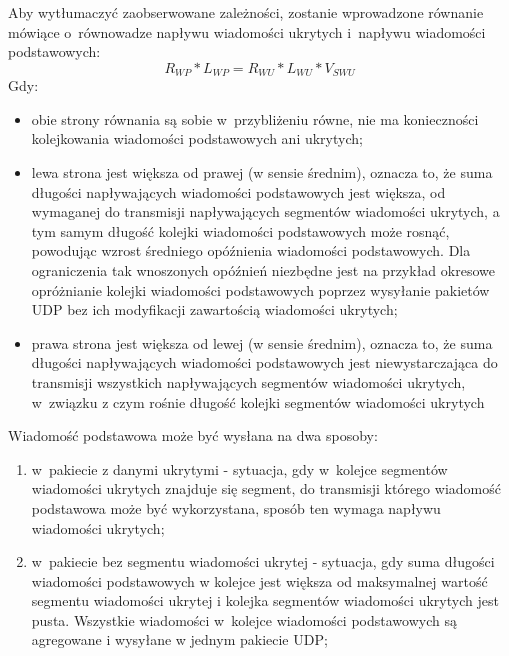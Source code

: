 \documentclass[a4paper, twoside, 12pt]{report}
\begin{document}
            Aby wytłumaczyć zaobserwowane zależności, zostanie wprowadzone równanie
            mówiące o~równowadze napływu wiadomości ukrytych i~napływu wiadomości podstawowych:
            \begin{equation} \label{ROWNANIEROWNOWAGI}
            R_{WP} * L_{WP} = R_{WU} * L_{WU} * V_{SWU}
            \end{equation}
            Gdy:
            \begin{itemize}
                \item obie strony równania są sobie w~przybliżeniu równe, nie ma konieczności
            kolejkowania wiadomości podstawowych ani ukrytych;
                \item lewa strona jest
            większa od prawej (w sensie średnim), oznacza to, że suma długości napływających wiadomości podstawowych
            jest większa, od wymaganej do transmisji napływających segmentów wiadomości ukrytych,
            a tym samym długość kolejki wiadomości podstawowych może rosnąć, powodując
            wzrost średniego opóźnienia wiadomości podstawowych. Dla ograniczenia tak
            wnoszonych opóźnień niezbędne jest na przykład okresowe opróżnianie kolejki
            wiadomości podstawowych poprzez wysyłanie pakietów UDP bez ich modyfikacji
            zawartością wiadomości ukrytych;
                \item prawa strona jest
            większa od lewej (w sensie średnim), oznacza to, że suma długości napływających wiadomości
            podstawowych jest niewystarczająca do transmisji wszystkich napływających
            segmentów wiadomości ukrytych, w~związku z czym rośnie długość kolejki
            segmentów wiadomości ukrytych
    \end{itemize}

            Wiadomość podstawowa może być wysłana na dwa sposoby:
            \begin{enumerate}
                \item w~pakiecie z danymi ukrytymi - sytuacja, gdy w~kolejce
                    segmentów wiadomości ukrytych znajduje się segment, do transmisji którego
                    wiadomość podstawowa może być wykorzystana, sposób ten wymaga
                    napływu wiadomości ukrytych;
                \item w~pakiecie bez segmentu wiadomości ukrytej - sytuacja, gdy suma długości wiadomości
                    podstawowych w kolejce jest większa od
                    maksymalnej wartość segmentu wiadomości ukrytej i kolejka segmentów wiadomości
                    ukrytych jest pusta. Wszystkie wiadomości w~kolejce wiadomości
                    podstawowych są agregowane i wysyłane w jednym pakiecie UDP;
            \end{enumerate}
\end{document}
